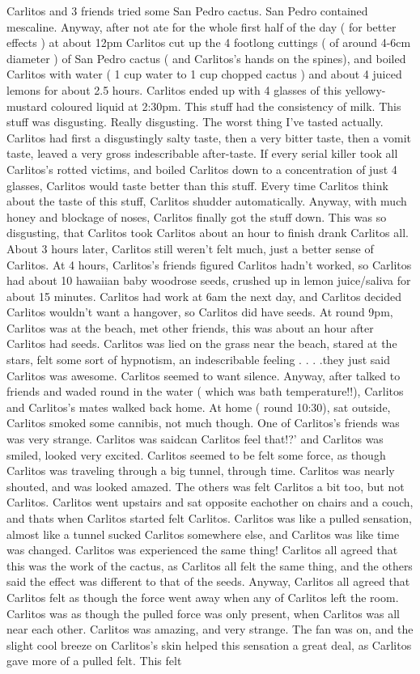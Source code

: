 \documentclass[12pt]{book}
\begin{document}
Carlitos and 3 friends tried some San Pedro cactus. San Pedro contained mescaline. Anyway, after not ate for the whole first half of the day ( for better effects ) at about 12pm Carlitos cut up the 4 footlong cuttings ( of around 4-6cm diameter ) of San Pedro cactus ( and Carlitos's hands on the spines), and boiled Carlitos with water ( 1 cup water to 1 cup chopped cactus ) and about 4 juiced lemons for about 2.5 hours. Carlitos ended up with 4 glasses of this yellowy-mustard coloured liquid at 2:30pm. This stuff had the consistency of milk. This stuff was disgusting. Really disgusting. The worst thing I've tasted actually. Carlitos had first a disgustingly salty taste, then a very bitter taste, then a vomit taste, leaved a very gross indescribable after-taste. If every serial killer took all Carlitos's rotted victims, and boiled Carlitos down to a concentration of just 4 glasses, Carlitos would taste better than this stuff. Every time Carlitos think about the taste of this stuff, Carlitos shudder automatically. Anyway, with much honey and blockage of noses, Carlitos finally got the stuff down. This was so disgusting, that Carlitos took Carlitos about an hour to finish drank Carlitos all. About 3 hours later, Carlitos still weren't felt much, just a better sense of Carlitos. At 4 hours, Carlitos's friends figured Carlitos hadn't worked, so Carlitos had about 10 hawaiian baby woodrose seeds, crushed up in lemon juice/saliva for about 15 minutes. Carlitos had work at 6am the next day, and Carlitos decided Carlitos wouldn't want a hangover, so Carlitos did have seeds. At round 9pm, Carlitos was at the beach, met other friends, this was about an hour after Carlitos had seeds. Carlitos was lied on the grass near the beach, stared at the stars, felt some sort of hypnotism, an indescribable feeling . . .  .they just said Carlitos was awesome. Carlitos seemed to want silence. Anyway, after talked to friends and waded round in the water ( which was bath temperature!!), Carlitos and Carlitos's mates walked back home. At home ( round 10:30), sat outside, Carlitos smoked some cannibis, not much though. One of Carlitos's friends was was very strange. Carlitos was saidcan Carlitos feel that!?' and Carlitos was smiled, looked very excited. Carlitos seemed to be felt some force, as though Carlitos was traveling through a big tunnel, through time. Carlitos was nearly shouted, and was looked amazed. The others was felt Carlitos a bit too, but not Carlitos. Carlitos went upstairs and sat opposite eachother on chairs and a couch, and thats when Carlitos started felt Carlitos. Carlitos was like a pulled sensation, almost like a tunnel sucked Carlitos somewhere else, and Carlitos was like time was changed. Carlitos was experienced the same thing! Carlitos all agreed that this was the work of the cactus, as Carlitos all felt the same thing, and the others said the effect was different to that of the seeds. Anyway, Carlitos all agreed that Carlitos felt as though the force went away when any of Carlitos left the room. Carlitos was as though the pulled force was only present, when Carlitos was all near each other. Carlitos was amazing, and very strange. The fan was on, and the slight cool breeze on Carlitos's skin helped this sensation a great deal, as Carlitos gave more of a pulled felt. This felt 
\end{document}
